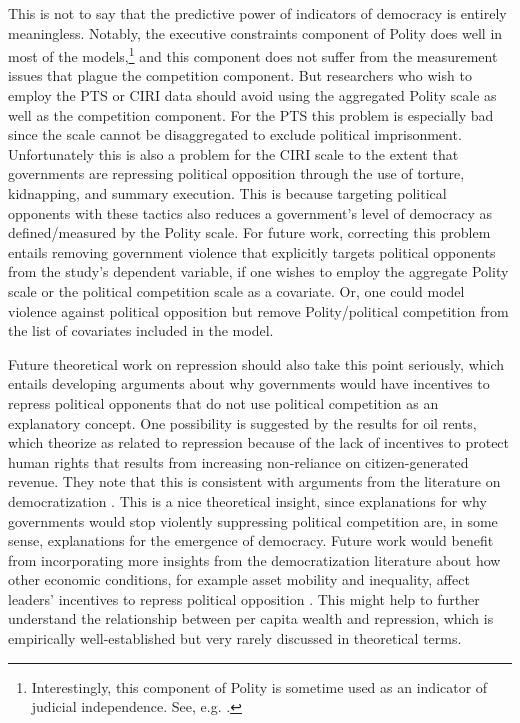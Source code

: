 \documentclass[11pt]{article}
\begin{document}
This is not to say that the predictive power of indicators of democracy is entirely meaningless. Notably, the executive constraints component of Polity does well in most of the models,\footnote{Interestingly, this component of Polity is sometime used as an indicator of judicial independence. See, e.g. \citet{Hathaway2007,RiosStaton2012,LinzerStaton2011}.} and this component does not suffer from the measurement issues that plague the competition component. But researchers who wish to employ the PTS or CIRI data should avoid using the aggregated Polity scale as well as the competition component. For the PTS this problem is especially bad since the scale cannot be disaggregated to exclude political imprisonment. Unfortunately this is also a problem for the CIRI scale to the extent that governments are repressing political opposition through the use of torture, kidnapping, and summary execution. This is because targeting political opponents with these tactics also reduces a government's level of democracy as defined/measured by the Polity scale. For future work, correcting this problem entails removing government violence that explicitly targets political opponents from the study's dependent variable, if one wishes to employ the aggregate Polity scale or the political competition scale as a covariate. Or, one could model violence against political opposition but remove Polity/political competition from the list of covariates included in the model. 

Future theoretical work on repression should also take this point seriously, which entails developing arguments about why governments would have incentives to repress political opponents that do not use political competition as an explanatory concept. One possibility is suggested by the results for oil rents, which \citet{DemerittYoung2013} theorize as related to repression because of the lack of incentives to protect human rights that results from increasing non-reliance on citizen-generated revenue. They note that this is consistent with arguments from the literature on democratization \citep[E.g.][]{Huntington1991,BDMSmith2009}. This is a nice theoretical insight, since explanations for why governments would stop violently suppressing political competition are, in some sense, explanations for the emergence of democracy. Future work would benefit from incorporating more insights from the democratization literature about how other economic conditions, for example asset mobility and inequality, affect leaders' incentives to repress political opposition \citep[See, e.g.][]{Boix2003,AcemogluRobinson2005,ClarkGolderGolder2013}. This might help to further understand the relationship between per capita wealth and repression, which is empirically well-established but very rarely discussed in theoretical terms.  
\end{document}
